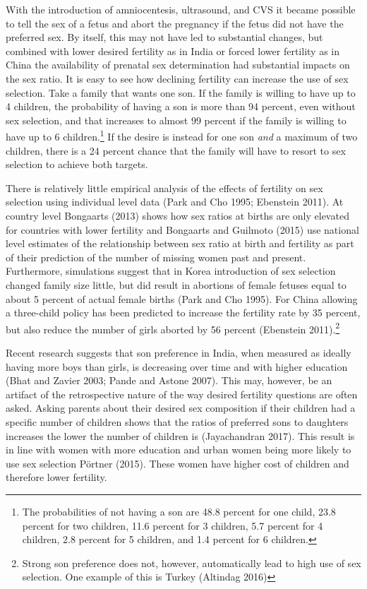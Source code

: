 \documentclass[]{article}
\begin{document}
With the introduction of amniocentesis, ultrasound, and CVS it became possible to tell the sex of a fetus and abort the pregnancy if the fetus did not have the preferred sex. By itself, this may not have led to substantial changes, but combined with lower desired fertility as in India or forced lower fertility as in China the availability of prenatal sex determination had substantial impacts on the sex ratio. It is easy to see how declining fertility can increase the use of sex selection. Take a family that wants one son. If the family is willing to have up to 4 children, the probability of having a son is more than 94 percent, even without sex selection, and that increases to almost 99 percent if the family is willing to have up to 6 children.\footnote{The probabilities of not having a son are 48.8 percent for one child, 23.8 percent for two children, 11.6 percent for 3 children, 5.7 percent for 4 children, 2.8 percent for 5 children, and 1.4 percent for 6 children.} If the desire is instead for one son \emph{and} a maximum of two children, there is a 24 percent chance that the family will have to resort to sex selection to achieve both targets.

There is relatively little empirical analysis of the effects of fertility on sex selection using individual level data (Park and Cho 1995; Ebenstein 2011). At country level Bongaarts (2013) shows how sex ratios at births are only elevated for countries with lower fertility and Bongaarts and Guilmoto (2015) use national level estimates of the relationship between sex ratio at birth and fertility as part of their prediction of the number of missing women past and present. Furthermore, simulations suggest that in Korea introduction of sex selection changed family size little, but did result in abortions of female fetuses equal to about 5 percent of actual female births (Park and Cho 1995). For China allowing a three-child policy has been predicted to increase the fertility rate by 35 percent, but also reduce the number of girls aborted by 56 percent (Ebenstein 2011).\footnote{Strong son preference does not, however, automatically lead to high use of sex selection. One example of this is Turkey (Altindag 2016)}

Recent research suggests that son preference in India, when measured as ideally having more boys than girls, is decreasing over time and with higher education (Bhat and Zavier 2003; Pande and Astone 2007). This may, however, be an artifact of the retrospective nature of the way desired fertility questions are often asked. Asking parents about their desired sex composition if their children had a specific number of children shows that the ratios of preferred sons to daughters increases the lower the number of children is (Jayachandran 2017). This result is in line with women with more education and urban women being more likely to use sex selection Pörtner (2015). These women have higher cost of children and therefore lower fertility.
\end{document}
